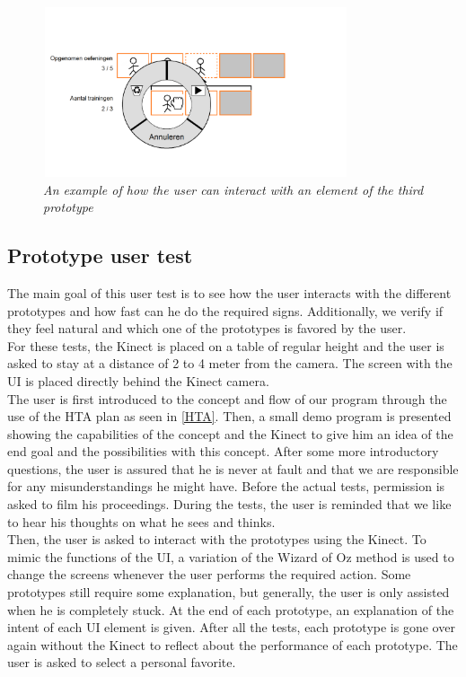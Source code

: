 \begin{figure}[H]
	\begin{center}
		\includegraphics[width=9cm, height=5cm]{figures/prototype_10_6_example.png}
		\caption{\emph{An example of how the user can interact with an element of the third prototype}}
		\label{example last prototype}
	\end{center}
\end{figure}


\subsection{Prototype user test}

The main goal of this user test is to see how the user interacts with the different prototypes and how fast can he do the required signs. Additionally, we verify if they feel natural and which one of the prototypes is favored by the user.\\

For these tests, the Kinect is placed on a table of regular height and the user is asked to stay at a distance of 2 to 4 meter from the camera. The screen with the UI is placed directly behind the Kinect camera.\\

The user is first introduced to the concept and flow of our program through the use of the HTA plan as seen in \ref{HTA}. Then, a small demo program is presented showing the capabilities of the concept and the Kinect to give him an idea of the end goal and the possibilities with this concept. After some more introductory questions, the user is assured that he is never at fault and that we are responsible for any misunderstandings he might have. Before the actual tests, permission is asked to film his proceedings. During the tests, the user is reminded that we like to hear his thoughts on what he sees and thinks.\\

Then, the user is asked to interact with the prototypes using the Kinect. To mimic the functions of the UI, a variation of the Wizard of Oz method \cite{WizardOfOz} is used to change the screens whenever the user performs the required action. Some prototypes still require some explanation, but generally, the user is only assisted when he is completely stuck. At the end of each prototype, an explanation of the intent of each UI element is given. After all the tests, each prototype is gone over again without the Kinect to reflect about the performance of each prototype. The user is asked to select a personal favorite.\\

